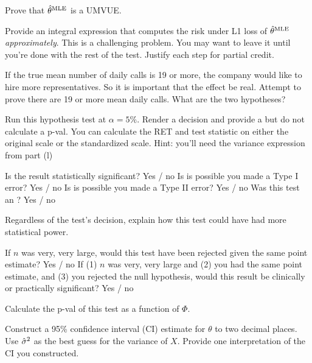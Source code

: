 \documentclass[12pt]{article}
\begin{document}
\begin{enumerate}[(a)]
 Prove that $\hat{\theta}^{\mathrm{MLE}}$ is a UMVUE.

 Provide an integral expression that  computes the risk under L1 loss of $\hat{\theta}^{\mathrm{MLE}}$ \emph{approximately}. This is a challenging problem. You may want to leave it until you're done with the rest of the test. Justify each step for partial credit.

 If the true mean number of daily calls is 19 or more, the company would like to hire more representatives. So it is important that the effect be real. Attempt to prove there are 19 or more mean daily calls. What are the two hypotheses?

 Run this hypothesis test at $\alpha = 5\%$. Render a decision and provide a  but do not calculate a p-val. You can calculate the RET and test statistic on either the original scale or the standardized scale. Hint: you'll need the variance expression from part (l)


 Is the result statistically significant? Yes / no 
 Is is possible you made a Type I error? Yes / no 
 Is is possible you made a Type II error? Yes / no 
 Was this test an ? Yes / no 

 Regardless of the test's decision, explain how this test could have had more statistical power.


 If $n$ was very, very large, would this test have been rejected given the same point estimate? Yes / no 
 If (1) $n$ was very, very large and (2) you had the same point estimate, and (3) you rejected the null hypothesis, would this result be clinically or practically significant? Yes / no 

 Calculate the p-val of this test as a function of $\Phi$. 


 Construct a 95\% confidence interval (CI) estimate for $\theta$ to two decimal places. Use $\hat{\sigma}^2$ as the best guess for the variance of $X$. Provide one interpretation of the CI you constructed.

\end{enumerate}
\end{document}
